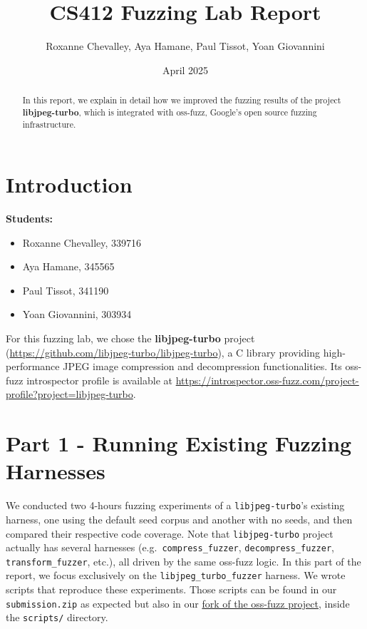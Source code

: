 \documentclass[12pt]{article}
\begin{document}
\title{\bfseries CS412 Fuzzing Lab Report}
\author{Roxanne Chevalley, Aya Hamane, Paul Tissot, Yoan Giovannini}
\date{April 2025}
\maketitle

\begin{abstract}
In this report, we explain in detail how we improved the fuzzing results of the project \textbf{libjpeg-turbo}, which is integrated with oss-fuzz, Google’s open source fuzzing infrastructure.
\end{abstract}

\section{Introduction}

\noindent\textbf{Students:}
\begin{itemize}
  \item Roxanne Chevalley, 339716
  \item Aya Hamane, 345565
  \item Paul Tissot, 341190
  \item Yoan Giovannini, 303934
\end{itemize}

\noindent For this fuzzing lab, we chose the \textbf{libjpeg-turbo} project (\url{https://github.com/libjpeg-turbo/libjpeg-turbo}), a C library providing high-performance JPEG image compression and decompression functionalities. Its oss-fuzz introspector profile is available at  
\url{https://introspector.oss-fuzz.com/project-profile?project=libjpeg-turbo}.

\section{Part 1 - Running Existing Fuzzing Harnesses}
We conducted two 4-hours fuzzing experiments of a \texttt{libjpeg-turbo}'s existing harness, one using the default seed corpus and another with no seeds, and then compared their respective code coverage. Note that \texttt{libjpeg-turbo} project actually has several harnesses (e.g.\ \texttt{compress\_fuzzer}, \texttt{decompress\_fuzzer}, \texttt{transform\_fuzzer}, etc.), all driven by the same oss-fuzz logic. In this part of the report, we focus exclusively on the \texttt{libjpeg\_turbo\_fuzzer} harness. We wrote scripts that reproduce these experiments. Those scripts can be found in our \texttt{submission.zip} as expected but also in our \href{https://github.com/roxannecvl/oss-fuzz/tree/main/scripts}{fork of the oss-fuzz project}, inside the \texttt{scripts/} directory.  \\
\end{document}
